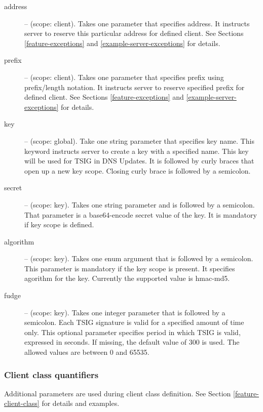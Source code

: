 \begin{description}
\item[address] -- (scope: client). Takes one parameter that specifies
   address. It instructs server to reserve this particular address for
   defined client. See Sections \ref{feature-exceptions}
   and \ref{example-server-exceptions} for details.

\item[prefix] -- (scope: client). Takes one parameter that specifies
   prefix using prefix/length notation. It instructs server to reserve
   specified prefix for defined client. See Sections \ref{feature-exceptions}
   and \ref{example-server-exceptions} for details.

\item[key] -- (scope: global). Take one string parameter that
   specifies key name. This keyword instructs server to create a key
   with a specified name. This key will be used for TSIG in DNS
   Updates. It is followed by curly braces that open up a new key
   scope. Closing curly brace is followed by a semicolon.

\item[secret] -- (scope: key). Takes one string parameter and is
   followed by a semicolon. That parameter is a base64-encode secret
   value of the key. It is mandatory if key scope is defined.
\item[algorithm] -- (scope: key). Takes one enum argument that is
   followed by a semicolon. This parameter is mandatory if the key
   scope is present. It specifies agorithm for the key. Currently the
   supported value is hmac-md5.
\item[fudge] -- (scope: key). Takes one integer parameter that is
   followed by a semicolon. Each TSIG signature is valid for a
   specified amount of time only. This optional parameter specifies
   period in which TSIG is valid, expressed in seconds. If missing,
   the default value of 300 is used. The allowed values are between 0
   and 65535.
\end{description}

\subsubsection{Client class quantifiers}
\label{class-expressions}
Additional parameters are used during client class definition. See
Section \ref{feature-client-class} for details and examples.

